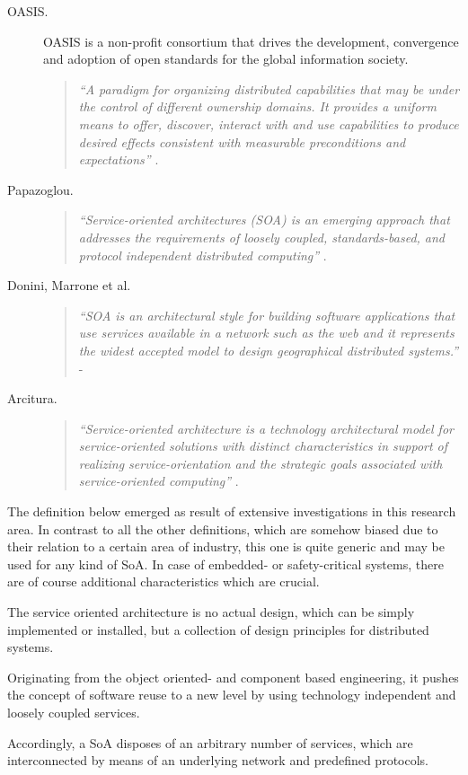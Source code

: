 \begin{description}
	\item [OASIS.]
	OASIS is a non-profit consortium that drives the development, convergence and adoption of open standards for the global information society.
	\begin{quote}
	\emph{``A paradigm for organizing distributed capabilities that may be under the control of different ownership domains. It provides a uniform means to offer, discover, interact with and use capabilities to produce desired effects consistent with measurable preconditions and expectations''} \cite{oasis2006}.
	\end{quote}

	\item [Papazoglou.]
	\begin{quote}
	\emph{``Service-oriented architectures (SOA) is an emerging approach that addresses the requirements of loosely coupled, standards-based, and protocol independent distributed computing''} \cite{papazoglou2007}.
	\end{quote}

	\item [Donini, Marrone et al.]
	\begin{quote}
	\emph{``SOA is an architectural style for building software applications that use services available in a network such as the web and it represents the widest accepted model to design geographical distributed systems.''} - \cite{donini2008}
	\end{quote}

	\item [Arcitura.]
	\begin{quote}
	\emph{``Service-oriented architecture is a technology architectural model for service-oriented solutions with distinct characteristics in support of realizing service-orientation and the strategic goals associated with service-oriented computing''} \cite{arcitura}.
	\end{quote}
\end{description}

The definition below emerged as result of extensive investigations in this research area. In contrast to all the other definitions, which are somehow biased due to their relation to a certain area of industry, this one is quite generic and may be used for any kind of SoA. In case of embedded- or safety-critical systems, there are of course additional characteristics which are crucial.

\begin{myquote}
	The service oriented architecture is no actual design, which can be simply implemented or installed, but a collection of design principles for distributed systems.

	Originating from the object oriented- and component based engineering, it pushes the concept of software reuse to a new level by using technology independent and loosely coupled services.

	Accordingly, a SoA disposes of an arbitrary number of services, which are interconnected by means of an underlying network and predefined protocols.
\end{myquote}

